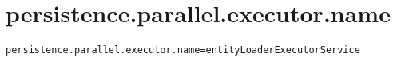 \section{persistence.parallel.executor.name}
\label{configuration:PersistenceParallelExecutorName}
\ClearAPI
\TODO
{}
\begin{lstlisting}[style=Props,caption={Usage example for \textit{persistence.parallel.executor.name}}]
persistence.parallel.executor.name=entityLoaderExecutorService
\end{lstlisting}